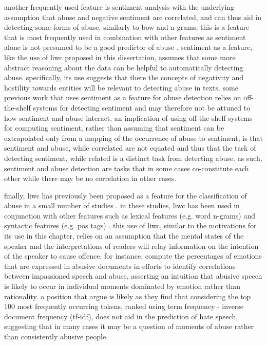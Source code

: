 another frequently used feature is sentiment analysis \citep{fortuna:2018} with the underlying assumption that abuse and negative sentiment are correlated, and can thus aid in detecting some forms of abuse.
similarly to bow and n-grams, this is a feature that is most frequently used in combination with other features as sentiment alone is not presumed to be a good predictor of abuse \citep{fortuna:2018}.
sentiment as a feature, like the use of liwc proposed in this dissertation, assumes that some more abstract reasoning about the data can be helpful to automatically detecting abuse.
specifically, its use suggests that there the concepts of negativity and hostility towards entities will be relevant to detecting abuse in texts.
some previous work that uses sentiment as a feature for abuse detection \citep{davidson:2017} relies on off-the-shelf systems for detecting sentiment and may therefore not be attuned to how sentiment and abuse interact.
an implication of using off-the-shelf systems for computing sentiment, rather than assuming that sentiment can be extrapolated only from a mapping of the occurrence of abuse to sentiment, is that sentiment and abuse, while correlated are not equated and thus that the task of detecting sentiment, while related is a distinct task from detecting abuse.
as such, sentiment and abuse detection are tasks that in some cases co-constitute each other while there may be no correlation in other cases.

finally, liwc has previously been proposed as a feature for the classification of abuse in a small number of studies \citep{nina:2018,joksimovic:2019}.
in these studies, liwc has been used in conjunction with other features such as lexical features (e.g. word n-grams) and syntactic features (e.g. pos tags) \citep{joksimovic:2019}.
this use of liwc, similar to the motivations for its use in this chapter, relies on an assumption that the mental states of the speaker and the interpretations of readers will relay information on the intention of the speaker to cause offence.
for instance, \citet{nina:2018} compute the percentages of emotions that are expressed in abusive documents in efforts to identify correlations between impassioned speech and abuse, asserting an intuition that abusive speech is likely to occur in individual moments dominated by emotion rather than rationality.
a position that \citep{waseem:2016} argue is likely as they find that considering the top $100$ most frequently occurring tokens, ranked using term frequency - inverse document frequency (tf-idf), does not aid in the prediction of hate speech, suggesting that in many cases it may be a question of moments of abuse rather than consistently abusive people.

